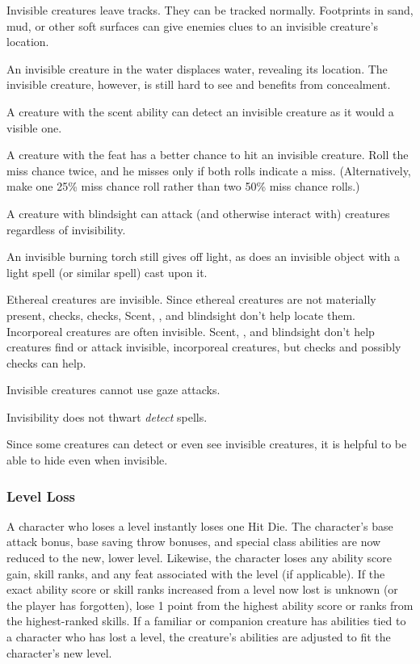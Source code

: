 Invisible creatures leave tracks. They can be tracked normally. Footprints in sand, mud, or other soft surfaces can give enemies clues to an invisible creature's location.

An invisible creature in the water displaces water, revealing its location. The invisible creature, however, is still hard to see and benefits from concealment.

A creature with the scent ability can detect an invisible creature as it would a visible one.

A creature with the  feat has a better chance to hit an invisible creature. Roll the miss chance twice, and he misses only if both rolls indicate a miss. (Alternatively, make one 25\% miss chance roll rather than two 50\% miss chance rolls.)

A creature with blindsight can attack (and otherwise interact with) creatures regardless of invisibility.

An invisible burning torch still gives off light, as does an invisible object with a light spell (or similar spell) cast upon it.

Ethereal creatures are invisible. Since ethereal creatures are not materially present,  checks,  checks, Scent, , and blindsight don't help locate them. Incorporeal creatures are often invisible. Scent, , and blindsight don't help creatures find or attack invisible, incorporeal creatures, but  checks and possibly  checks can help.

Invisible creatures cannot use gaze attacks.

Invisibility does not thwart \emph{detect} spells.

Since some creatures can detect or even see invisible creatures, it is helpful to be able to hide even when invisible.

\subsubsection{Level Loss}
A character who loses a level instantly loses one Hit Die. The character's base attack bonus, base saving throw bonuses, and special class abilities are now reduced to the new, lower level. Likewise, the character loses any ability score gain, skill ranks, and any feat associated with the level (if applicable). If the exact ability score or skill ranks increased from a level now lost is unknown (or the player has forgotten), lose 1 point from the highest ability score or ranks from the highest-ranked skills. If a familiar or companion creature has abilities tied to a character who has lost a level, the creature's abilities are adjusted to fit the character's new level.


